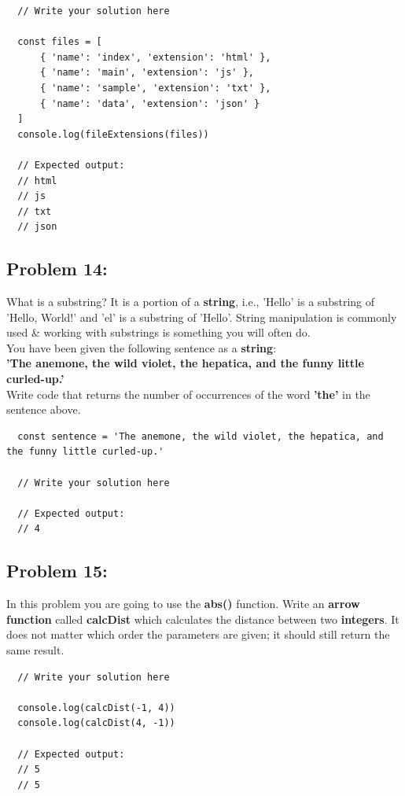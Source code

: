 \documentclass{article}
\begin{document}
\begin{verbatim}
  // Write your solution here

  const files = [
      { 'name': 'index', 'extension': 'html' },
      { 'name': 'main', 'extension': 'js' },
      { 'name': 'sample', 'extension': 'txt' },
      { 'name': 'data', 'extension': 'json' }
  ]
  console.log(fileExtensions(files))

  // Expected output:
  // html
  // js
  // txt
  // json
\end{verbatim}

\subsection*{Problem 14:}
What is a substring? It is a portion of a \textbf{string}, i.e., 'Hello' is a substring of 'Hello, World!' and 'el' is a substring of 'Hello'. String manipulation is commonly used \& working with substrings is something you will often do. \\

You have been given the following sentence as a \textbf{string}: \\

\textbf{'The anemone, the wild violet, the hepatica, and the funny little curled-up.'} \\

Write code that returns the number of occurrences of the word \textbf{'the'} in the sentence above.

\begin{verbatim}
  const sentence = 'The anemone, the wild violet, the hepatica, and the funny little curled-up.'

  // Write your solution here

  // Expected output:
  // 4
\end{verbatim}

\subsection*{Problem 15:}
In this problem you are going to use the \textbf{abs()} function. Write an \textbf{arrow function} called \textbf{calcDist} which calculates the distance between two \textbf{integers}. It does not matter which order the parameters are given; it should still return the same result. 

\begin{verbatim}
  // Write your solution here

  console.log(calcDist(-1, 4))
  console.log(calcDist(4, -1))

  // Expected output:
  // 5
  // 5
\end{verbatim}
\end{document}

